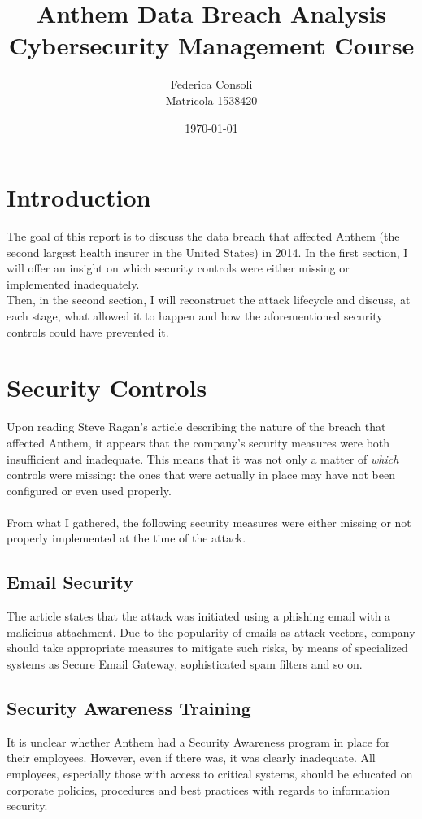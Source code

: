 \documentclass[12pt]{extarticle}
\title{%
	Anthem Data Breach Analysis\\
	\large Cybersecurity Management Course}
\author{Federica Consoli\\Matricola 1538420}
\date{\today}
\begin{document}
	\maketitle
	\newpage
	\section{Introduction}
	The goal of this report is to discuss the data breach that affected Anthem (the second largest health insurer in the United States) in 2014. In the first section, I will offer an insight on which security controls were either missing or implemented inadequately.\\ Then, in the second section, I will reconstruct the attack lifecycle and discuss, at each stage, what allowed it to happen and how the aforementioned security controls could have prevented it. 
	\section{Security Controls}
	Upon reading Steve Ragan's article \cite{breacharticle} describing the nature of the breach that affected Anthem, it appears that the company's security measures were both insufficient and inadequate. This means that it was not only a matter of \textit{which} controls were missing: the ones that were actually in place may have not been configured or even used properly.\\\\
	From what I gathered, the following security measures were either missing or not properly implemented at the time of the attack. 
	\subsection{Email Security}
	The article states that the attack was initiated using a phishing email with a malicious attachment. Due to the popularity of emails as attack vectors, company should take appropriate measures to mitigate such risks, by means of specialized systems as Secure Email Gateway, sophisticated spam filters and so on.
	\subsection{Security Awareness Training}
	It is unclear whether Anthem had a Security Awareness program in place for their employees. However, even if there was, it was clearly inadequate. All employees, especially those with access to critical systems, should be educated on corporate policies, procedures and best practices with regards to information security.
\end{document}
